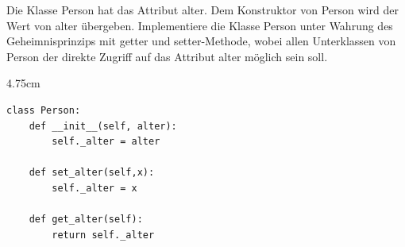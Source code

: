 \question[3]
Die Klasse Person hat das Attribut alter. Dem Konstruktor von Person wird der
Wert von alter übergeben. Implementiere die Klasse Person
unter Wahrung des Geheimnisprinzips mit getter und setter-Methode,
wobei allen Unterklassen von Person der direkte Zugriff auf das Attribut
alter möglich sein soll.

\begin{solutionbox}{4.75cm}
\begin{lstlisting}
class Person:
    def __init__(self, alter):
        self._alter = alter

    def set_alter(self,x):
        self._alter = x

    def get_alter(self):
        return self._alter
\end{lstlisting}
\end{solutionbox}
